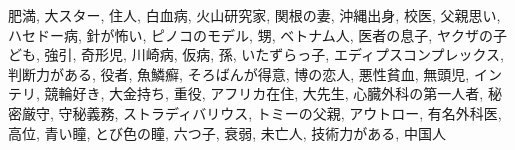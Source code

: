 \documentclass[a4j,12pt]{jsreport}
\begin{document}
肥満, 大スター, 住人, 白血病, 火山研究家, 関根の妻, 沖縄出身, 校医, 父親思い, ハセドー病, 針が怖い, ピノコのモデル, 甥, ベトナム人, 医者の息子, ヤクザの子ども, 強引, 奇形児, 川崎病, 仮病, 孫, いたずらっ子, エディプスコンプレックス, 判断力がある, 役者, 魚鱗癬, そろばんが得意, 博の恋人, 悪性貧血, 無頭児, インテリ, 競輪好き, 大金持ち, 重役, アフリカ在住, 大先生, 心臓外科の第一人者, 秘密厳守, 守秘義務, ストラディバリウス, トミーの父親, アウトロー, 有名外科医, 高位, 青い瞳, とび色の瞳, 六つ子, 衰弱, 未亡人, 技術力がある, 中国人


\end{document}
